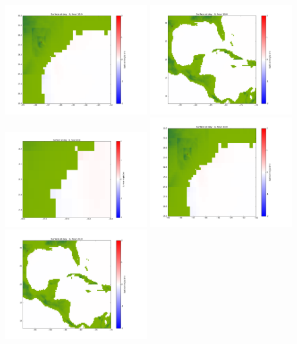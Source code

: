 \documentclass[11pt]{article}
\begin{document}
\includegraphics[width=0.475\textwidth]{frame0033fig1002.png}
\vskip 10pt 
\includegraphics[width=0.475\textwidth]{frame0033fig1003.png}
\vskip 10pt 
\includegraphics[width=0.475\textwidth]{frame0034fig1001.png}
\includegraphics[width=0.475\textwidth]{frame0034fig1002.png}
\vskip 10pt 
\includegraphics[width=0.475\textwidth]{frame0034fig1003.png}
\end{document}
